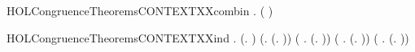 \newcommand{\HOLCongruenceTheoremsCONTEXTXXcases}{\UseVerbatim{HOLCongruenceTheoremsCONTEXTXXcases}}
\begin{SaveVerbatim}{HOLCongruenceTheoremsCONTEXTXXcombin}
\HOLTokenTurnstile{} \HOLSymConst{\HOLTokenForall{}} .   \HOLSymConst{\HOLTokenConj{}}   \HOLSymConst{\HOLTokenImp{}}  ( \HOLConst{\HOLTokenCompose} )
\end{SaveVerbatim}
\newcommand{\HOLCongruenceTheoremsCONTEXTXXcombin}{\UseVerbatim{HOLCongruenceTheoremsCONTEXTXXcombin}}
\begin{SaveVerbatim}{HOLCongruenceTheoremsCONTEXTXXind}
\HOLTokenTurnstile{} \HOLSymConst{\HOLTokenForall{}}.
        (\HOLTokenLambda{}. ) \HOLSymConst{\HOLTokenConj{}} (\HOLSymConst{\HOLTokenForall{}}.  (\HOLTokenLambda{}. )) \HOLSymConst{\HOLTokenConj{}}
       (\HOLSymConst{\HOLTokenForall{}} .   \HOLSymConst{\HOLTokenImp{}}  (\HOLTokenLambda{}.  )) \HOLSymConst{\HOLTokenConj{}}
       (\HOLSymConst{\HOLTokenForall{}} .
              \HOLSymConst{\HOLTokenConj{}}   \HOLSymConst{\HOLTokenImp{}}
             (\HOLTokenLambda{}.   \HOLSymConst{\ensuremath{+}}  )) \HOLSymConst{\HOLTokenConj{}}
       (\HOLSymConst{\HOLTokenForall{}} .
              \HOLSymConst{\HOLTokenConj{}}   \HOLSymConst{\HOLTokenImp{}}
             (\HOLTokenLambda{}.   \HOLSymConst{\ensuremath{\parallel}}  )) \HOLSymConst{\HOLTokenConj{}}

\end{SaveVerbatim}
